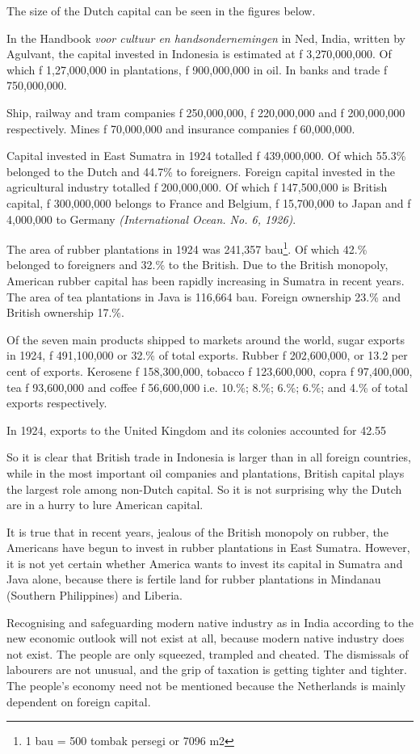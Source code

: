 The size of the Dutch capital can be seen in the figures below.\vskip 0.2in

In the Handbook \emph{voor cultuur en handsondernemingen} in Ned, India, written by Agulvant, the capital 
invested in Indonesia is estimated at f 3,270,000,000. Of which f 1,27,000,000 in plantations, f 900,000,000 in oil. 
In banks and trade f 750,000,000.\vskip 0.2in

Ship, railway and tram companies f 250,000,000, f 220,000,000 and f 200,000,000 respectively. 
Mines f 70,000,000 and insurance companies f 60,000,000.\vskip 0.2in

Capital invested in East Sumatra in 1924 totalled f 439,000,000. Of which 55.3\% belonged to the Dutch and 44.7\% to foreigners. 
Foreign capital invested in the agricultural industry totalled f 200,000,000. Of which f 147,500,000 is British capital, 
f 300,000,000 belongs to France and Belgium, f 15,700,000 to Japan and f 4,000,000 to Germany \emph{(International Ocean. No. 6, 1926)}.\vskip 0.2in

The area of rubber plantations in 1924 was 241,357 bau\footnote[5]{1 bau = 500 tombak persegi or 7096 m2}. Of which 42.\% belonged to foreigners and 32.\% to 
the British. Due to the British monopoly, American rubber capital has been rapidly increasing in Sumatra in 
recent years. The area of tea plantations in Java is 116,664 bau. Foreign ownership 23.\% and British ownership 17.\%.

Of the seven main products shipped to markets around the world, sugar exports in 1924, f 491,100,000 or 32.\% 
of total exports. Rubber f 202,600,000, or 13.2 per cent of exports. Kerosene f 158,300,000, tobacco f 123,600,000, 
copra f 97,400,000, tea f 93,600,000 and coffee f 56,600,000 i.e. 10.\%; 8.\%; 6.\%; 6.\%; and 4.\% of total exports respectively.\vskip 0.2in

In 1924, exports to the United Kingdom and its colonies accounted for 42.55%

So it is clear that British trade in Indonesia is larger than in all foreign countries, while in the most important oil companies and plantations, British capital plays the largest role among non-Dutch capital. So it is not surprising why the Dutch are in a hurry to lure American capital.

It is true that in recent years, jealous of the British monopoly on rubber, 
the Americans have begun to invest in rubber plantations in East Sumatra. However, 
it is not yet certain whether America wants to invest its capital in Sumatra and Java 
alone, because there is fertile land for rubber plantations in Mindanau (Southern Philippines) and Liberia.\vskip 0.2in

Recognising and safeguarding modern native industry as in India according 
to the new economic outlook will not exist at all, because modern native 
industry does not exist. The people are only squeezed, trampled and cheated. 
The dismissals of labourers are not unusual, and the grip of taxation is 
getting tighter and tighter. The people's economy need not be mentioned because 
the Netherlands is mainly dependent on foreign capital.\vskip 0.2in